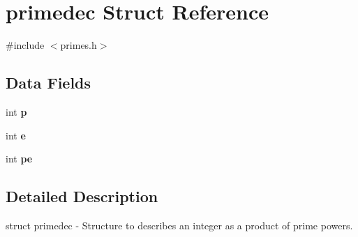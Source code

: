 \hypertarget{structprimedec}{}\section{primedec Struct Reference}
\label{structprimedec}


{\ttfamily \#include $<$primes.\+h$>$}

\subsection*{Data Fields}
\begin{DoxyCompactItemize}
\item 
\hypertarget{structprimedec_a6e025254ba7562c64462aec8d61fb8d1}{}int {\bfseries p}\label{structprimedec_a6e025254ba7562c64462aec8d61fb8d1}

\item 
\hypertarget{structprimedec_a9ecab71f5fdbe2aa999384da3091575f}{}int {\bfseries e}\label{structprimedec_a9ecab71f5fdbe2aa999384da3091575f}

\item 
\hypertarget{structprimedec_a42f98b52a0350aadc421e73745ecc49c}{}int {\bfseries pe}\label{structprimedec_a42f98b52a0350aadc421e73745ecc49c}

\end{DoxyCompactItemize}


\subsection{Detailed Description}
struct primedec -\/ Structure to describes an integer as a product of prime powers. 